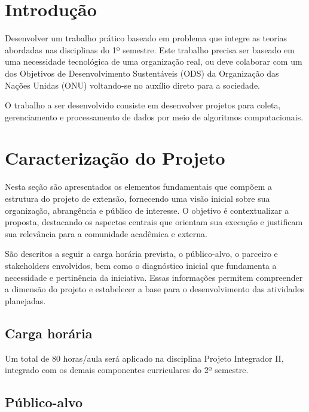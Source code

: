 \chapter{Introdução}
\label{cap:intr}

Desenvolver um trabalho prático baseado em problema que integre as teorias abordadas nas disciplinas do 1º semestre. Este trabalho precisa ser baseado em uma necessidade tecnológica de uma organização real, ou deve colaborar com um dos Objetivos de Desenvolvimento Sustentáveis (ODS) da Organização das Nações Unidas (ONU) voltando-se no auxílio direto para a sociedade.

O trabalho a ser desenvolvido consiste em desenvolver projetos para coleta, gerenciamento e processamento de dados por meio de algoritmos computacionais.


\chapter{Caracterização do Projeto}
\label{cap:caracterizacao}

Nesta seção são apresentados os elementos fundamentais que compõem a estrutura do projeto de extensão, fornecendo uma visão inicial sobre sua organização, abrangência e público de interesse. O objetivo é contextualizar a proposta, destacando os aspectos centrais que orientam sua execução e justificam sua relevância para a comunidade acadêmica e externa.

São descritos a seguir a carga horária prevista, o público-alvo, o parceiro e stakeholders envolvidos, bem como o diagnóstico inicial que fundamenta a necessidade e pertinência da iniciativa. Essas informações permitem compreender a dimensão do projeto e estabelecer a base para o desenvolvimento das atividades planejadas.

\section{Carga horária}

Um total de 80 horas/aula será aplicado na disciplina Projeto Integrador II, integrado com os demais componentes curriculares do 2º semestre.

\section{Público-alvo}

